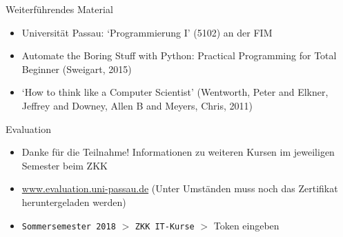 \begin{frame}{Weiterführendes Material}
\begin{itemize}
    \item Universität Passau: `Programmierung I' (5102) an der FIM
    \item Automate the Boring Stuff with Python: Practical Programming for Total Beginner (Sweigart, 2015)
    \item `How to think like a Computer Scientist' (Wentworth, Peter and Elkner, Jeffrey and Downey, Allen B and Meyers, Chris, 2011) 
\end{itemize}
\end{frame}

\begin{frame}{Evaluation}
\begin{itemize}
    \item Danke für die Teilnahme! Informationen zu weiteren Kursen im jeweiligen Semester beim ZKK
    \item \url{www.evaluation.uni-passau.de} (Unter Umständen muss noch das Zertifikat
        heruntergeladen werden)
    \item \texttt{Sommersemester 2018} $>$ \texttt{ZKK IT-Kurse} $>$ Token eingeben 
\end{itemize}
\end{frame}

